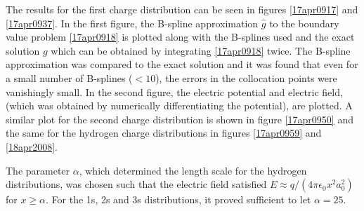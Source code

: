 \documentclass[twocolumn]{article}
\begin{document}
\begin{large}
The results for the first charge distribution can be seen in figures \ref{17apr0917} and \ref{17apr0937}. In the first figure, the B-spline approximation $\hat{g}$ to the boundary value problem \eqref{17apr0918} is plotted along with the B-splines used and the exact solution $g$ which can be obtained by integrating \eqref{17apr0918} twice. The B-spline approximation was compared to the exact solution and it was found that even for a small number of B-splines ($<10$), the errors in the collocation points were vanishingly small. In the second figure, the electric potential and electric field, (which was obtained by numerically differentiating the potential), are plotted. A similar plot for the second charge distribution is shown in figure \ref{17apr0950} and the same for the hydrogen charge distributions in figures \ref{17apr0959} and \ref{18apr2008}. 

The parameter $\alpha$, which determined the length scale for the hydrogen distributions, was chosen such that the electric field satisfied $E\approx q/(4\pi\epsilon_0x^2a_0^2)$ for $x \geq \alpha$. For the 1s, 2s and 3s distributions, it proved sufficient to let $\alpha=25$.




\end{large}
\end{document}
